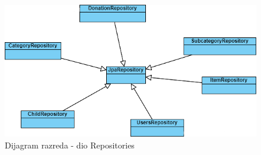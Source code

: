 			\begin{figure}[H]
				\includegraphics[width=\textwidth,height=0.4\textheight]{dijagrami/Repozitoriji.png}
				\centering
				\caption{Dijagram razreda - dio Repositories}
				\label{fig:Repositories}
			\end{figure}

			
			
			
			
			\eject
		
			
			
			
			
			
		
			
			
			
		
		
